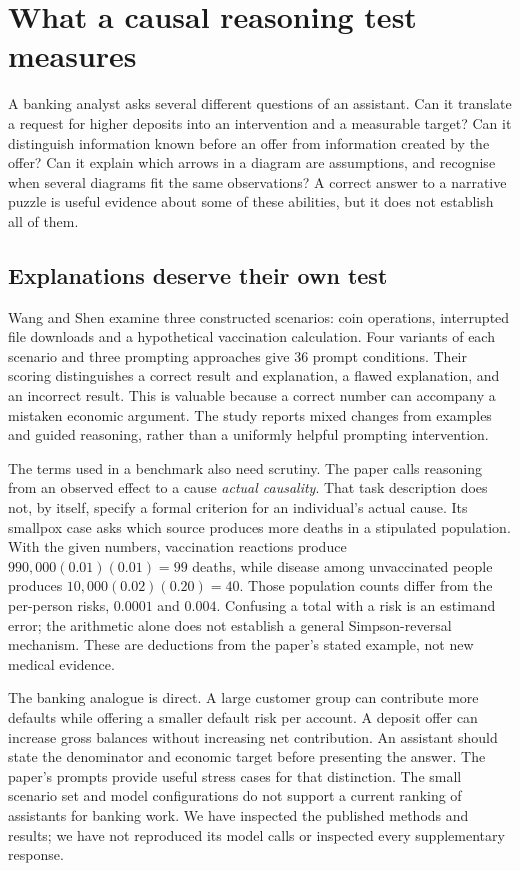 \chapter{What a causal reasoning test measures}
\label{gap29:frontier}
A banking analyst asks several different questions of an assistant. Can it
translate a request for higher deposits into an intervention and a measurable
target? Can it distinguish information known before an offer from information
created by the offer? Can it explain which arrows in a diagram are assumptions,
and recognise when several diagrams fit the same observations? A correct
answer to a narrative puzzle is useful evidence about some of these abilities,
but it does not establish all of them.

\section{Explanations deserve their own test}
Wang and Shen examine three constructed scenarios: coin operations, interrupted
file downloads and a hypothetical vaccination calculation. Four variants of
each scenario and three prompting approaches give 36 prompt conditions.
Their scoring distinguishes a correct result and explanation, a flawed
explanation, and an incorrect result. This is valuable because a correct
number can accompany a mistaken economic argument. The study reports mixed
changes from examples and guided reasoning, rather than a uniformly helpful
prompting intervention. \citep{gap29wangshen}

The terms used in a benchmark also need scrutiny. The paper calls reasoning
from an observed effect to a cause \emph{actual causality}. That task description
does not, by itself, specify a formal criterion for an individual's actual
cause. Its smallpox case asks which source produces more deaths in a stipulated
population. With the given numbers, vaccination reactions produce
$990{,}000(0.01)(0.01)=99$ deaths, while disease among unvaccinated people
produces $10{,}000(0.02)(0.20)=40$. Those population counts differ from the
per-person risks, $0.0001$ and $0.004$. Confusing a total with a risk is an
estimand error; the arithmetic alone does not establish a general
Simpson-reversal mechanism. These are deductions from the paper's stated
example, not new medical evidence.

The banking analogue is direct. A large customer group can contribute more
defaults while offering a smaller default risk per account. A deposit offer
can increase gross balances without increasing net contribution. An assistant
should state the denominator and economic target before presenting the
answer. The paper's prompts provide useful stress cases for that distinction.
The small scenario set and model configurations do not support a current
ranking of assistants for banking work. We have inspected the published
methods and results; we have not reproduced its model calls or inspected every
supplementary response.

